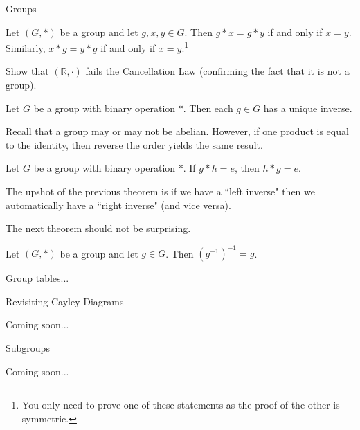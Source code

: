 \begin{section}{Groups}
\begin{theorem}
Let $(G,*)$ be a group and let $g,x,y\in G$.  Then $g*x=g*y$ if and only if $x=y$.  Similarly, $x*g=y*g$ if and only if $x=y$.\footnote{You only need to prove one of these statements as the proof of the other is symmetric.}
\end{theorem}

\begin{exercise}
Show that $(\mathbb{R},\cdot)$ fails the Cancellation Law (confirming the fact that it is not a group).
\end{exercise}

\begin{corollary}
Let $G$ be a group with binary operation $*$.  Then each $g\in G$ has a unique inverse.
\end{corollary}

Recall that a group may or may not be abelian.  However, if one product is equal to the identity, then reverse the order yields the same result.

\begin{theorem}
Let $G$ be a group with binary operation $*$.  If $g*h=e$, then $h*g=e$.
\end{theorem}

The upshot of the previous theorem is if we have a ``left inverse" then we automatically have a ``right inverse" (and vice versa).

The next theorem should not be surprising.

\begin{theorem}
Let $(G,*)$ be a group and let $g\in G$.  Then $(g^{-1})^{-1}=g$.
\end{theorem}

Group tables...

\end{section}

\begin{section}{Revisiting Cayley Diagrams}

Coming soon...

\end{section}

\begin{section}{Subgroups}

Coming soon...

\end{section}